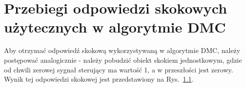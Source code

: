 \chapter{Przebiegi odpowiedzi skokowych użytecznych w algorytmie DMC}
Aby otrzymać odpowiedź skokową wykorzystywaną w algorytmie DMC, należy postępować analogicznie - należy pobudzić obiekt skokiem jednostkowym, gdzie od chwili zerowej sygnał sterujący ma wartość 1, a w przeszłości jest zerowy. Wynik tej odpowiedzi skokowej jest przedstawiony na Rys.~\ref{skokDMC}.
\begin{figure}
	\centering
	\caption{ }
	
	\label{skokDMC}
\end{figure}
